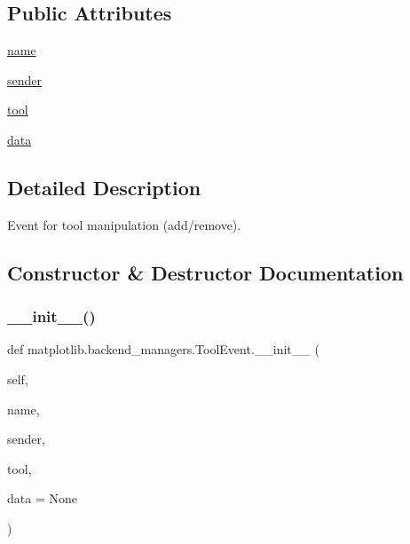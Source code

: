 \subsection*{Public Attributes}
\begin{DoxyCompactItemize}
\item 
\hyperlink{classmatplotlib_1_1backend__managers_1_1ToolEvent_a911e0e0aa3846d264fcf064a3b7b887d}{name}
\item 
\hyperlink{classmatplotlib_1_1backend__managers_1_1ToolEvent_a00635a362e6b1ad9e98be07804cb77a0}{sender}
\item 
\hyperlink{classmatplotlib_1_1backend__managers_1_1ToolEvent_a29cbd299e8a363ba74f8fcd50175b51e}{tool}
\item 
\hyperlink{classmatplotlib_1_1backend__managers_1_1ToolEvent_a26c96380714e79bad2d447ebc80ec6e3}{data}
\end{DoxyCompactItemize}


\subsection{Detailed Description}
\begin{DoxyVerb}Event for tool manipulation (add/remove).\end{DoxyVerb}
 

\subsection{Constructor \& Destructor Documentation}
\mbox{\label{classmatplotlib_1_1backend__managers_1_1ToolEvent_aee611a78577d9fa0c581cbd5c4a7f5fc}} 
\subsubsection{\texorpdfstring{\+\_\+\+\_\+init\+\_\+\+\_\+()}{\_\_init\_\_()}}
{\footnotesize\ttfamily def matplotlib.\+backend\+\_\+managers.\+Tool\+Event.\+\_\+\+\_\+init\+\_\+\+\_\+ (\begin{DoxyParamCaption}\item[{}]{self,  }\item[{}]{name,  }\item[{}]{sender,  }\item[{}]{tool,  }\item[{}]{data = {\ttfamily None} }\end{DoxyParamCaption})}



